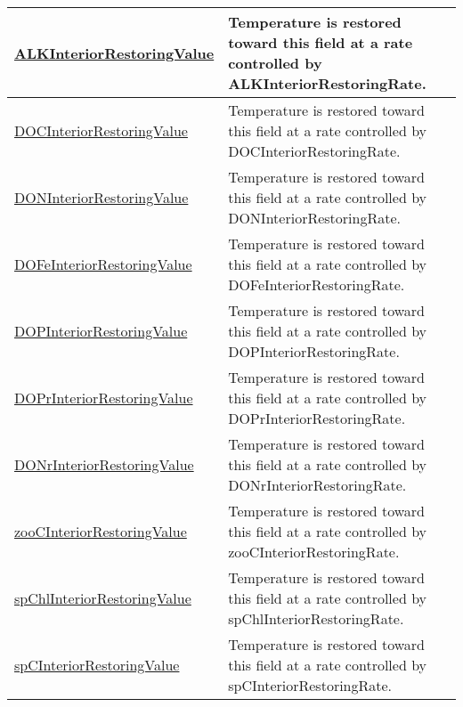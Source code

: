 {\begin{center}
\begin{longtable}{| p{2.0in} | p{4.0in} |}
    \hline
    \hyperref[subsec:var_sec_tracersInteriorRestoringFields_ALKInteriorRestoringValue]{ALKInteriorRestoringValue} & Temperature is restored toward this field at a rate controlled by ALKInteriorRestoringRate. \\
    \hline
    \hyperref[subsec:var_sec_tracersInteriorRestoringFields_DOCInteriorRestoringValue]{DOCInteriorRestoringValue} & Temperature is restored toward this field at a rate controlled by DOCInteriorRestoringRate. \\
    \hline
    \hyperref[subsec:var_sec_tracersInteriorRestoringFields_DONInteriorRestoringValue]{DONInteriorRestoringValue} & Temperature is restored toward this field at a rate controlled by DONInteriorRestoringRate. \\
    \hline
    \hyperref[subsec:var_sec_tracersInteriorRestoringFields_DOFeInteriorRestoringValue]{DOFeInteriorRestoringValue} & Temperature is restored toward this field at a rate controlled by DOFeInteriorRestoringRate. \\
    \hline
    \hyperref[subsec:var_sec_tracersInteriorRestoringFields_DOPInteriorRestoringValue]{DOPInteriorRestoringValue} & Temperature is restored toward this field at a rate controlled by DOPInteriorRestoringRate. \\
    \hline
    \hyperref[subsec:var_sec_tracersInteriorRestoringFields_DOPrInteriorRestoringValue]{DOPrInteriorRestoringValue} & Temperature is restored toward this field at a rate controlled by DOPrInteriorRestoringRate. \\
    \hline
    \hyperref[subsec:var_sec_tracersInteriorRestoringFields_DONrInteriorRestoringValue]{DONrInteriorRestoringValue} & Temperature is restored toward this field at a rate controlled by DONrInteriorRestoringRate. \\
    \hline
    \hyperref[subsec:var_sec_tracersInteriorRestoringFields_zooCInteriorRestoringValue]{zooCInteriorRestoringValue} & Temperature is restored toward this field at a rate controlled by zooCInteriorRestoringRate. \\
    \hline
    \hyperref[subsec:var_sec_tracersInteriorRestoringFields_spChlInteriorRestoringValue]{spChlInteriorRestoringValue} & Temperature is restored toward this field at a rate controlled by spChlInteriorRestoringRate. \\
    \hline
    \hyperref[subsec:var_sec_tracersInteriorRestoringFields_spCInteriorRestoringValue]{spCInteriorRestoringValue} & Temperature is restored toward this field at a rate controlled by spCInteriorRestoringRate. \\

\end{longtable}
\end{center}}
